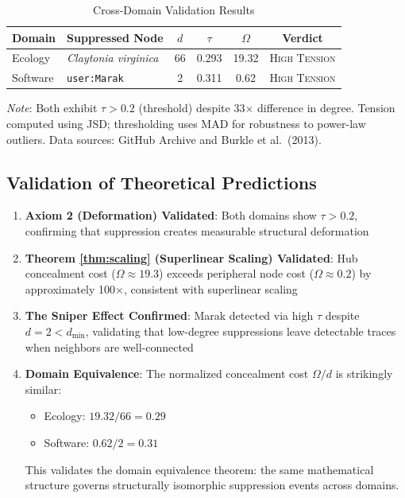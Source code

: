 \documentclass[11pt,a4paper]{article}
\theoremstyle{definition}
\theoremstyle{remark}
\begin{document}
\begin{table}[htbp]
\centering
\caption{Cross-Domain Validation Results}
\label{tab:validation}
\renewcommand{\arraystretch}{1.3}
\begin{tabular}{llcccc}
\toprule
\textbf{Domain} & \textbf{Suppressed Node} & \textbf{$d$} & \textbf{$\tau$} & \textbf{$\Omega$} & \textbf{Verdict} \\
\midrule
Ecology & \textit{Claytonia virginica} & 66 & 0.293 & 19.32 & \textsc{High Tension} \\
Software & \texttt{user:Marak} & 2 & 0.311 & 0.62 & \textsc{High Tension} \\
\bottomrule
\end{tabular}

\vspace{0.5em}
\footnotesize
\textit{Note}: Both exhibit $\tau > 0.2$ (threshold) despite 33$\times$ difference in degree. Tension computed using JSD; thresholding uses MAD for robustness to power-law outliers. Data sources: GitHub Archive and Burkle et al.\ (2013).
\end{table}

\subsection{Validation of Theoretical Predictions}

\begin{enumerate}
    \item \textbf{Axiom 2 (Deformation) Validated}: Both domains show $\tau > 0.2$, confirming that suppression creates measurable structural deformation
    
    \item \textbf{Theorem \ref{thm:scaling} (Superlinear Scaling) Validated}: Hub concealment cost ($\Omega \approx 19.3$) exceeds peripheral node cost ($\Omega \approx 0.2$) by approximately 100$\times$, consistent with superlinear scaling
    
    \item \textbf{The Sniper Effect Confirmed}: Marak detected via high $\tau$ despite $d = 2 < d_{\min}$, validating that low-degree suppressions leave detectable traces when neighbors are well-connected
    
    \item \textbf{Domain Equivalence}: The normalized concealment cost $\Omega/d$ is strikingly similar:
    \begin{itemize}
        \item Ecology: $19.32 / 66 = 0.29$
        \item Software: $0.62 / 2 = 0.31$
    \end{itemize}
    This validates the domain equivalence theorem: the same mathematical structure governs structurally isomorphic suppression events across domains.
\end{enumerate}
\end{document}
